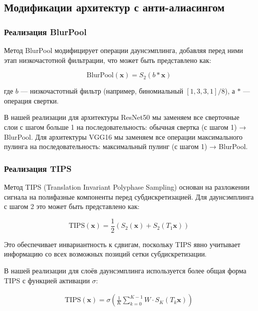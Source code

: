 \subsection{Модификации архитектур с анти-алиасингом}
\label{sec:architectures}

\subsubsection{Реализация BlurPool}
\label{sec:architectures:blurpool}

Метод BlurPool модифицирует операции даунсэмплинга, добавляя перед ними этап низкочастотной фильтрации, что может быть представлено как:

\begin{equation}
\text{BlurPool}(\mathbf{x}) = S_2(b * \mathbf{x})
\end{equation}

где $b$ — низкочастотный фильтр (например, биномиальный $[1, 3, 3, 1]/8$), а $*$ — операция свертки. 

В нашей реализации для архитектуры ResNet50 мы заменяем все сверточные слои с шагом больше 1 на последовательность: обычная свертка (с шагом 1) → BlurPool. Для архитектуры VGG16 мы заменяем все операции максимального пулинга на последовательность: максимальный пулинг (с шагом 1) → BlurPool.

\subsubsection{Реализация TIPS}
\label{sec:architectures:tips}

Метод TIPS (Translation Invariant Polyphase Sampling) основан на разложении сигнала на полифазные компоненты перед субдискретизацией. Для даунсэмплинга с шагом 2 это может быть представлено как:

\begin{equation}
\text{TIPS}(\mathbf{x}) = \frac{1}{2}(S_2(\mathbf{x}) + S_2(T_1 \mathbf{x}))
\end{equation}

Это обеспечивает инвариантность к сдвигам, поскольку TIPS явно учитывает информацию со всех возможных позиций сетки субдискретизации.

В нашей реализации для слоёв даунсэмплинга используется более общая форма TIPS с функцией активации $\sigma$:

\begin{multline}
\text{TIPS}(\mathbf{x}) = \sigma\left(\frac{1}{K}\sum_{k=0}^{K-1} W \cdot S_K(T_k \mathbf{x})\right)
\end{multline}

